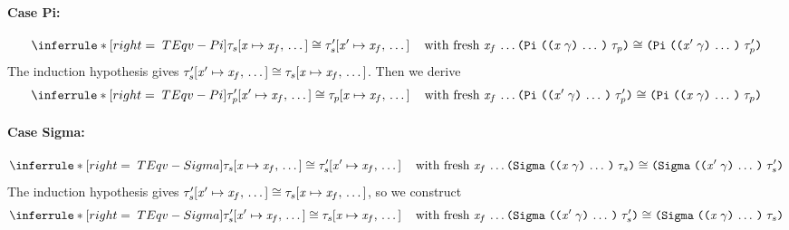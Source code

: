 \begin{sproof}
  \paragraph{Case {\sc Pi}:}
  \[\infr[TEqv-Pi]
  {\teqv
    {\seqsubst{\type_s}{\var}{\var_f}}
    {\seqsubst{\type_s'}{\var'}{\var_f}}
    \fresh{\sequence{\var_f}}}
  {\teqv
    {\typedprod{\sequence{\notevar{\var}{\sort}}}{\type_p}}
    {\typedprod{\sequence{\notevar{\var'}{\sort}}}{\type_p'}}}\]
  The induction hypothesis gives
  $\mathit{\tau}_s'\hspace{-2pt}\left[ \mathit{x}' \mapsto \mathit{x}_f, \, \ldots \, \right] \cong \mathit{\tau}_s\hspace{-2pt}\left[ \mathit{x} \mapsto \mathit{x}_f, \, \ldots \, \right]$.
  Then we derive
  \[\infr[TEqv-Pi]
  {\teqv
    {\seqsubst{\type_p'}{\var'}{\var_f}}
    {\seqsubst{\type_p}{\var}{\var_f}}
    \fresh{\sequence{\var_f}}}
  {\teqv
    {\typedprod{\sequence{\notevar{\var'}{\sort}}}{\type_p'}}
    {\typedprod{\sequence{\notevar{\var}{\sort}}}{\type_p}}}\]
  \paragraph{Case {\sc Sigma}:}
  \[\infr[TEqv-Sigma]
  {\teqv
    {\seqsubst{\type_s}{\var}{\var_f}}
    {\seqsubst{\type_s'}{\var'}{\var_f}}
    \fresh{\sequence{\var_f}}}
  {\teqv
    {\typedsum{\sequence{\notevar{\var}{\sort}}}{\type_s}}
    {\typedsum{\sequence{\notevar{\var'}{\sort}}}{\type_s'}}}\]
  The induction hypothesis gives
  $\mathit{\tau}_s'\hspace{-2pt}\left[ \mathit{x}' \mapsto \mathit{x}_f, \, \ldots \, \right] \cong \mathit{\tau}_s\hspace{-2pt}\left[ \mathit{x} \mapsto \mathit{x}_f, \, \ldots \, \right]$,
  so we construct
  \[\infr[TEqv-Sigma]
  {\teqv
    {\seqsubst{\type_s'}{\var'}{\var_f}}
    {\seqsubst{\type_s}{\var}{\var_f}}
    \fresh{\sequence{\var_f}}}
  {\teqv
    {\typedsum{\sequence{\notevar{\var'}{\sort}}}{\type_s'}}
    {\typedsum{\sequence{\notevar{\var}{\sort}}}{\type_s}}}\]
\end{sproof}

